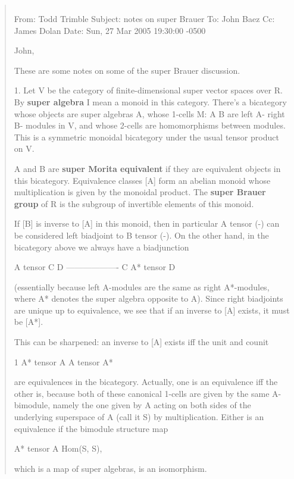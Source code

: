 \begin{quote}

$$

From: Todd Trimble 
Subject: notes on super Brauer 
To: John Baez 
Cc: James Dolan 
Date: Sun, 27 Mar 2005 19:30:00 -0500 

John, 

These are some notes on some of the super Brauer discussion.  

1.  Let V be the category of finite-dimensional super vector 
spaces over R.  By \textbf{super algebra} I mean a monoid in this 
category.  There's a bicategory whose objects are super 
algebras A, whose 1-cells  M: A \to  B  are left A- right B-
modules in V, and whose 2-cells are homomorphisms
between modules.  This is a symmetric monoidal bicategory 
under the usual tensor product on V.  

A and B are \textbf{super Morita equivalent} if they are equivalent 
objects in this bicategory.  Equivalence classes [A] form 
an abelian monoid whose multiplication is given by the 
monoidal product.  The \textbf{super Brauer group} of R is the 
subgroup of invertible elements of this monoid. 

If [B] is inverse to [A] in this monoid, then in particular 
A tensor (-)  can be considered left biadjoint to  B tensor (-). 
On the other hand, in the bicategory above we always have 
a biadjunction 

                    A tensor C \to  D 
                   -------------------
                    C \to  A* tensor D

(essentially because left A-modules are the same as right 
A*-modules, where A* denotes the super algebra opposite 
to A).  Since right biadjoints are unique up to equivalence, 
we see that if an inverse to [A] exists, it must be [A*]. 

This can be sharpened: an inverse to [A] exists iff the 
unit and counit 

         1 \to  A* tensor A       A tensor A* 

are equivalences in the bicategory.  Actually, one is an 
equivalence iff the other is, because both of these 
canonical 1-cells are given by the same A-bimodule,  
namely the one given by A acting on both sides of 
the underlying superspace of A (call it S) by multiplication.  
Either is an equivalence if the bimodule structure map 

                 A* tensor A \to  Hom(S, S),    

which is a map of super algebras, is an isomorphism. 


\end{quote}

